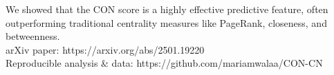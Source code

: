 \documentclass[preview]{standalone}
\begin{document}
We showed that the CON score is a highly effective predictive feature, often outperforming traditional centrality measures like PageRank, closeness, and betweenness.\\arXiv paper: https://arxiv.org/abs/2501.19220\\Reproducible analysis & data: https://github.com/mariamwalaa/CON-CN\\
\end{document}
